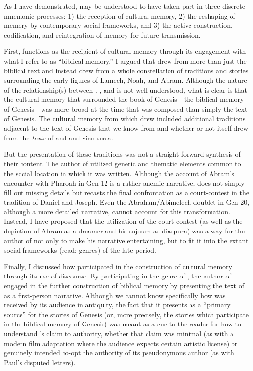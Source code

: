 As I have demonstrated, \ga may be understood to have taken part in three discrete mnemonic processes: 1) the reception of cultural memory, 2) the reshaping of memory by contemporary social frameworks, and 3) the active construction, codification, and reintegration of memory for future transmission. 

First, \ga functions as the recipient of cultural memory through its engagement with what I refer to as  ``biblical memory.'' I argued that \ga drew from more than just the biblical text and instead drew from a whole constellation of traditions and stories surrounding the early figures of Lamech, Noah, and Abram. Although the nature of the relationship(s) between \firstenoch, \jub, and \ga is not well understood, what is clear is that the cultural memory that surrounded the book of Genesis---the biblical memory of Genesis---was more broad at the time that \ga was composed than simply the text of Genesis. The cultural memory from which \ga drew included additional traditions adjacent to the text of Genesis that we know from \jub and \firstenoch whether or not \ga itself drew from the \emph{texts} of \jub and \firstenoch and vice versa.


But the presentation of these traditions was not a straight-forward synthesis of their content. The author of \ga utilized generic and thematic elements common to the social location in which it was written. Although the account of Abram's encounter with Pharoah in Gen 12 is a rather anemic narrative, \ga does not simply fill out missing details but recasts the final confrontation as a court-contest in the tradition of Daniel and Joseph. Even the Abraham/Abimelech doublet in Gen 20, although a more detailed narrative, cannot account for this transformation. Instead, I have proposed that the utilization of the court-contest (as well as the depiction of Abram as a dreamer and his sojourn as diaspora) was a way for the author of \ga not only to make his narrative entertaining, but to fit it into the extant social frameworks (read: genres) of the late \secondtemple period.

Finally, I discussed how \ga participated in the construction of cultural memory through its use of \psgraphical discourse. By participating in the genre of \psy, the author of \ga engaged in the further construction of biblical memory by presenting the text of \ga as a first-person narrative. Although we cannot know specifically how \ga was received by its audience in antiquity, the fact that it presents as a ``primary source'' for the stories of Genesis (or, more precisely, the stories which participate in the biblical memory of Genesis) was meant as a cue to the reader for how to understand \ga's claim to authority, whether that claim was minimal (as with a modern film adaptation where the audience expects certain artistic license) or genuinely intended co-opt the authority of its pseudonymous author (as with Paul's disputed letters).

